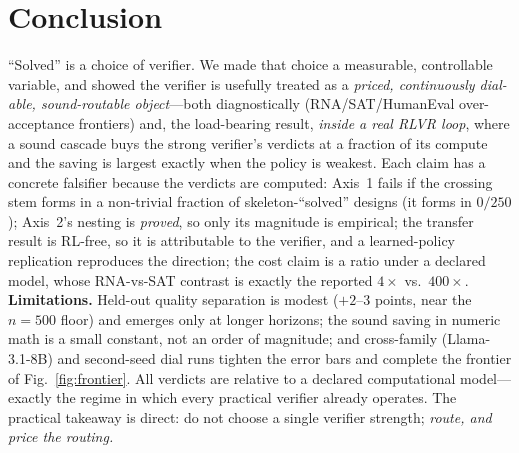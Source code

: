 \section{Conclusion}
``Solved'' is a choice of verifier. We made that choice a measurable, controllable variable, and showed the
verifier is usefully treated as a \emph{priced, continuously dial-able, sound-routable object}---both
diagnostically (RNA/SAT/HumanEval over-acceptance frontiers) and, the load-bearing result, \emph{inside a real
RLVR loop}, where a sound cascade buys the strong verifier's verdicts at a fraction of its compute and the
saving is largest exactly when the policy is weakest. Each claim has a concrete falsifier because the verdicts
are computed: Axis~1 fails if the crossing stem forms in a non-trivial fraction of skeleton-``solved'' designs
(it forms in $0/250$); Axis~2's nesting is \emph{proved}, so only its magnitude is empirical; the transfer
result is RL-free, so it is attributable to the verifier, and a learned-policy replication reproduces the
direction; the cost claim is a ratio under a declared model, whose RNA-vs-SAT contrast is exactly the reported
$4\times$ vs.\ $400\times$. \textbf{Limitations.} Held-out quality separation is modest ($+2$--$3$ points,
near the $n{=}500$ floor) and emerges only at longer horizons; the sound saving in numeric math is a small
constant, not an order of magnitude; and cross-family (Llama-3.1-8B) and second-seed dial runs
 tighten the error bars and complete the frontier of Fig.~\ref{fig:frontier}. All verdicts
are relative to a declared computational model---exactly the regime in which every practical verifier already
operates. The practical takeaway is direct: do not choose a single verifier strength; \emph{route, and price
the routing.}
